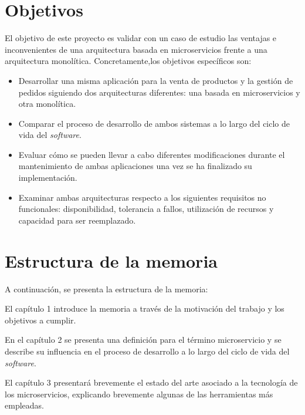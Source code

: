 \documentclass[11pt,spanish,listoffigures]{tfgetsinf}
\begin{document}
\newpage

\section{Objetivos}

El objetivo de este proyecto es validar con un caso de estudio las ventajas e inconvenientes de una arquitectura basada en microservicios frente a una arquitectura monolítica. Concretamente,los objetivos específicos son:

\begin{itemize}

\item Desarrollar una misma aplicación para la venta de productos y la gestión de pedidos siguiendo dos arquitecturas diferentes: una basada en microservicios y otra monolítica.

\item Comparar el proceso de desarrollo de ambos sistemas a lo largo del ciclo de vida del \textit{software}.

\item Evaluar cómo se pueden llevar a cabo diferentes modificaciones durante el mantenimiento de ambas aplicaciones una vez se ha finalizado su implementación.

\item Examinar ambas arquitecturas respecto a los siguientes requisitos no funcionales: disponibilidad, tolerancia a fallos, utilización de recursos y capacidad para ser reemplazado.

\end{itemize}

\section{Estructura de la memoria}

A continuación, se presenta la estructura de la memoria:

El capítulo 1 introduce la memoria a través de la motivación del trabajo y los objetivos a cumplir.

En el capítulo 2 se presenta una definición para el término microservicio y se describe su influencia en el proceso de desarrollo a lo largo del ciclo de vida del \textit{software}.

El capítulo 3 presentará brevemente el estado del arte asociado a la tecnología de los microservicios, explicando brevemente algunas de las herramientas más empleadas.
\end{document}
